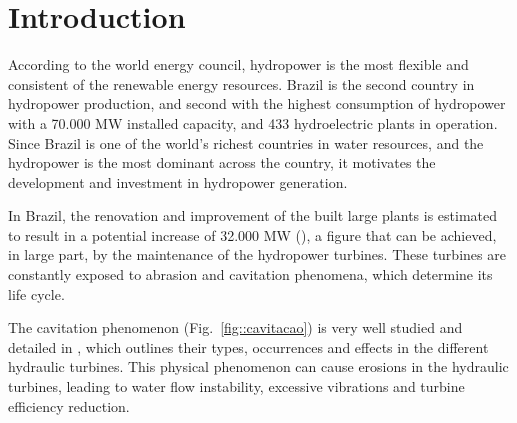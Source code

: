\section{Introduction}
According to the world energy council, hydropower is the most flexible and
consistent of the renewable energy resources. Brazil is the second
country in hydropower production, and second with the highest
consumption of hydropower with a 70.000 MW installed capacity, and 433
hydroelectric plants in operation. Since Brazil is one of the world's richest
countries in water resources, and the hydropower is the most dominant across
the country, it motivates the development and investment in hydropower
generation.


In Brazil, the renovation and improvement of the built large plants is estimated
to result in a potential increase of 32.000 MW (\cite{goldemberg2007energia}), a
figure that can be achieved, in large part, by the maintenance of the
hydropower turbines. These turbines are constantly exposed to abrasion and
cavitation phenomena, which determine its life cycle.

The cavitation phenomenon (Fig.~\ref{fig::cavitacao}) is very well studied and
detailed in \cite{escaler2006detection}, which outlines their types, occurrences and
effects in the different hydraulic turbines. This physical phenomenon can cause
erosions in the hydraulic turbines, leading to water flow instability,
excessive vibrations and turbine efficiency reduction.

